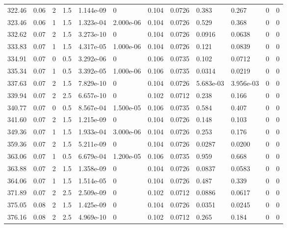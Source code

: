\documentclass[preview]{standalone}
\begin{document}
{{{\begin{tabular}{L{1.2cm}C{1.2cm} C{0.3cm}C{0.5cm} C{1.4cm}C{1.4cm} C{1.4cm}C{1.4cm} C{1.6cm}C{1.6cm} C{1.6cm}C{1.6cm}}
  322.46  &  0.06  & 2     & 1.5 &  1.144e-09  & 0  &  0.104&   0.0726& 0.383 & 0.267   &  0 & 0  \\ 
  323.46  &  0.06  & 1     & 1.5 &  1.323e-04  & 2.000e-06  &  0.104&   0.0726& 0.529 & 0.368   &  0 & 0  \\ 
  332.62  &  0.07  & 2     & 1.5 &  3.273e-10  & 0  &  0.104&   0.0726& 0.0916 & 0.0638   &  0 & 0  \\ 
  333.83  &  0.07  & 1     & 1.5 &  4.317e-05  & 1.000e-06  &  0.104&   0.0726& 0.121 & 0.0839   &  0 & 0  \\ 
  334.91  &  0.07  & 0     & 0.5 &  3.292e-06  & 0  &  0.106&   0.0735& 0.102 & 0.0712   &  0 & 0  \\ 
  335.34  &  0.07  & 1     & 0.5 &  3.392e-05  & 1.000e-06  &  0.106&   0.0735& 0.0314 & 0.0219   &  0 & 0  \\ 
  337.63  &  0.07  & 2     & 1.5 &  7.829e-10  & 0  &  0.104&   0.0726& 5.683e-03 & 3.956e-03   &  0 & 0  \\ 
  339.94  &  0.07  & 2     & 2.5 &  6.657e-10  & 0  &  0.102&   0.0712& 0.238 & 0.166   &  0 & 0  \\ 
  340.77  &  0.07  & 0     & 0.5 &  8.567e-04  & 1.500e-05  &  0.106&   0.0735& 0.584 & 0.407   &  0 & 0  \\ 
  341.60  &  0.07  & 2     & 1.5 &  1.215e-09  & 0  &  0.104&   0.0726& 0.148 & 0.103   &  0 & 0  \\ 
  349.36  &  0.07  & 1     & 1.5 &  1.933e-04  & 3.000e-06  &  0.104&   0.0726& 0.253 & 0.176   &  0 & 0  \\ 
  359.36  &  0.07  & 2     & 1.5 &  5.211e-09  & 0  &  0.104&   0.0726& 0.0287 & 0.0200   &  0 & 0  \\ 
  363.06  &  0.07  & 1     & 0.5 &  6.679e-04  & 1.200e-05  &  0.106&   0.0735& 0.959 & 0.668   &  0 & 0  \\ 
  363.88  &  0.07  & 2     & 1.5 &  1.358e-09  & 0  &  0.104&   0.0726& 0.0837 & 0.0583   &  0 & 0  \\ 
  364.06  &  0.07  & 1     & 1.5 &  1.514e-05  & 0  &  0.104&   0.0726& 0.487 & 0.339   &  0 & 0  \\ 
  371.89  &  0.07  & 2     & 2.5 &  2.509e-09  & 0  &  0.102&   0.0712& 0.0886 & 0.0617   &  0 & 0  \\ 
  375.05  &  0.08  & 2     & 1.5 &  1.425e-09  & 0  &  0.104&   0.0726& 0.0351 & 0.0245   &  0 & 0  \\ 
  376.16  &  0.08  & 2     & 2.5 &  4.969e-10  & 0  &  0.102&   0.0712& 0.265 & 0.184   &  0 & 0  \\ 

\end{tabular}}}}
\end{document}
